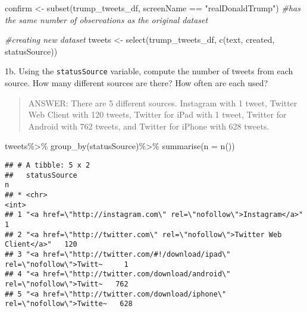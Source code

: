 \documentclass[
]{article}
\newenvironment{Shaded}{\begin{snugshade}}{\end{snugshade}}
\newcommand{\AttributeTok}[1]{\textcolor[rgb]{0.77,0.63,0.00}{#1}}
\newcommand{\CommentTok}[1]{\textcolor[rgb]{0.56,0.35,0.01}{\textit{#1}}}
\newcommand{\FunctionTok}[1]{\textcolor[rgb]{0.00,0.00,0.00}{#1}}
\newcommand{\NormalTok}[1]{#1}
\newcommand{\OtherTok}[1]{\textcolor[rgb]{0.56,0.35,0.01}{#1}}
\newcommand{\SpecialCharTok}[1]{\textcolor[rgb]{0.00,0.00,0.00}{#1}}
\newcommand{\StringTok}[1]{\textcolor[rgb]{0.31,0.60,0.02}{#1}}
\begin{document}
\begin{Shaded}
\begin{Highlighting}[]
\NormalTok{confirm }\OtherTok{\textless{}{-}} \FunctionTok{subset}\NormalTok{(trump\_tweets\_df, screenName }\SpecialCharTok{==} \StringTok{"realDonaldTrump"}\NormalTok{)}
\CommentTok{\#has the same number of observations as the original dataset}

\CommentTok{\#creating new dataset}
\NormalTok{tweets }\OtherTok{\textless{}{-}} \FunctionTok{select}\NormalTok{(trump\_tweets\_df, }\FunctionTok{c}\NormalTok{(text, created, statusSource))}
\end{Highlighting}
\end{Shaded}

\newpage

1b. Using the \texttt{statusSource} variable, compute the number of
tweets from each source. How many different sources are there? How often
are each used?

\begin{quote}
ANSWER: There are 5 different sources. Instagram with 1 tweet, Twitter
Web Client with 120 tweets, Twitter for iPad with 1 tweet, Twitter for
Android with 762 tweets, and Twitter for iPhone with 628 tweets.
\end{quote}

\begin{Shaded}
\begin{Highlighting}[]
\NormalTok{tweets}\SpecialCharTok{\%\textgreater{}\%}
\FunctionTok{group\_by}\NormalTok{(statusSource)}\SpecialCharTok{\%\textgreater{}\%}
  \FunctionTok{summarise}\NormalTok{(}\AttributeTok{n =} \FunctionTok{n}\NormalTok{())}
\end{Highlighting}
\end{Shaded}

\begin{verbatim}
## # A tibble: 5 x 2
##   statusSource                                                                 n
## * <chr>                                                                    <int>
## 1 "<a href=\"http://instagram.com\" rel=\"nofollow\">Instagram</a>"            1
## 2 "<a href=\"http://twitter.com\" rel=\"nofollow\">Twitter Web Client</a>"   120
## 3 "<a href=\"http://twitter.com/#!/download/ipad\" rel=\"nofollow\">Twitt~     1
## 4 "<a href=\"http://twitter.com/download/android\" rel=\"nofollow\">Twitt~   762
## 5 "<a href=\"http://twitter.com/download/iphone\" rel=\"nofollow\">Twitte~   628
\end{verbatim}
\end{document}
